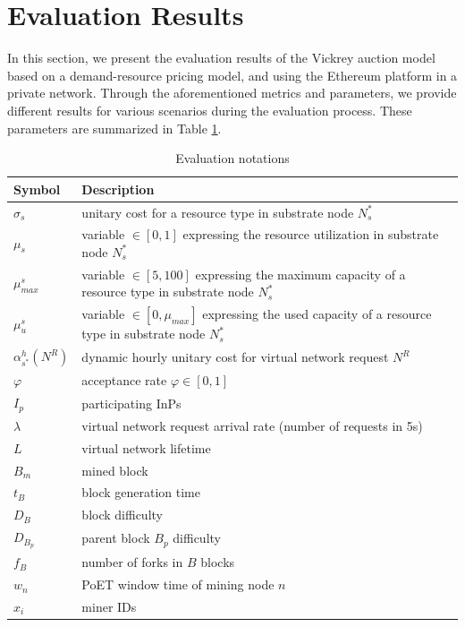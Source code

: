 \section{Evaluation Results}

In this section, we present the evaluation results of the Vickrey auction model based on a demand-resource pricing model, and using the Ethereum platform in a private network. Through the aforementioned metrics and parameters, we provide different results for various scenarios during the evaluation process. These parameters are summarized in Table \ref{tab:ev_notations}.

\begin{table}[htbp]
	\myfloatalign \footnotesize
	\begin{tabular}{m{2cm} m{13.5cm}}
		\textbf{Symbol} & \textbf{Description}\\ 
		\hline
		$\sigma_s$ & unitary cost for a resource type in substrate node $N_s^{*}$  \\
		$\mu_s$ & variable $\in [0,1]$ expressing the resource utilization in substrate node $N_s^{*}$ \\
		$\mu^{s}_{max}$ & variable $\in [5,100]$ expressing the maximum capacity of a resource type in substrate node $N_s^{*}$ \\
		$\mu^{s}_u$ & variable $\in [0,\mu_{max}]$ expressing the used capacity of a resource type in substrate node $N_s^{*}$ \\
		$\alpha^{h}_{s^{*}}(N^R)$ & dynamic hourly unitary cost for virtual network request $N^{R}$ \\
		$\varphi$ & acceptance rate $\varphi \in [0,1]$ \\
		$I_p$ & participating InPs \\
		$\lambda$ & virtual network request arrival rate (number of requests in 5s) \\
		$L$ & virtual network lifetime \\
		$B_m$ & mined block \\
		$t_B$ & block generation time \\
		$D_B$ & block difficulty \\
		$D_{B_p}$ & parent block $B_p$ difficulty \\
		$f_B$ & number of forks in $B$ blocks \\
		$w_n$ & PoET window time of mining node $n$ \\
		$x_i$ & miner IDs \\
		\hline
	\end{tabular}
	\caption{Evaluation notations}
	\label{tab:ev_notations}
\end{table}

